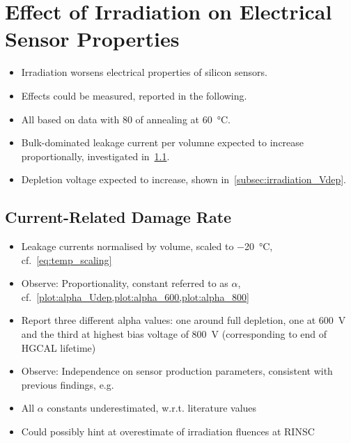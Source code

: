 \section{Effect of Irradiation on Electrical Sensor Properties}
\label{sec:irradiation}

\begin{itemize}
	\item Irradiation worsens electrical properties of silicon sensors.
	\item Effects could be measured, reported in the following.
	\item All based on data with \SI{80}{\min} of annealing at \SI{60}{\celsius}.
	\item Bulk-dominated leakage current per volumne expected to increase proportionally, investigated in~\ref{subsec:irradiation_alpha}.
	\item Depletion voltage expected to increase, shown in~\ref{subsec:irradiation_Vdep}.
\end{itemize}

\subsection{Current-Related Damage Rate}
\label{subsec:irradiation_alpha}

\begin{itemize}
	\item Leakage currents normalised by volume, scaled to \SI{-20}{\celsius}, cf.~\ref{eq:temp_scaling}
	\item Observe: Proportionality, constant referred to as $\alpha$, cf.~\ref{plot:alpha_Udep,plot:alpha_600,plot:alpha_800}
	\item Report three different alpha values: one around full depletion, one at \SI{600}{\volt} and the third at highest bias voltage of \SI{800}{\volt} (corresponding to end of HGCAL lifetime)
	\item Observe: Independence on sensor production parameters, consistent with previous findings, e.g.~\cite{moll:SiDamages}
	\item All $\alpha$ constants underestimated, w.r.t. literature values
	\item Could possibly hint at overestimate of irradiation fluences at RINSC
\end{itemize}


